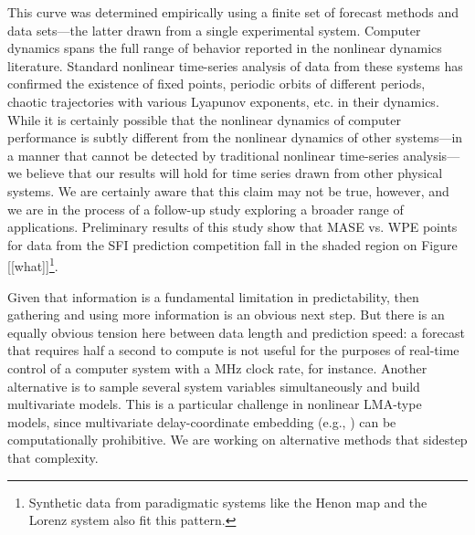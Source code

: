 This curve was determined empirically using a finite set of forecast
methods and data sets---the latter drawn from a single experimental
system.  Computer dynamics spans the full range of behavior reported
in the nonlinear dynamics literature.  Standard nonlinear time-series
analysis of data from these systems has confirmed the existence of
fixed points, periodic orbits of different periods, chaotic
trajectories with various Lyapunov exponents, etc. in their dynamics.
While it is certainly possible that the nonlinear dynamics of computer
performance is subtly different from the nonlinear dynamics of other
systems---in a manner that cannot be detected by traditional nonlinear
time-series analysis---we believe that our results will hold for time
series drawn from other physical systems.  We are certainly aware that
this claim may not be true, however, and we are in the process of a
follow-up study exploring a broader range of applications.
Preliminary results of this study show that MASE vs. WPE points for
data from the SFI prediction competition \cite{sfi} fall in the shaded
region on Figure [[what]]\footnote{Synthetic data from paradigmatic
  systems like the Henon map \cite{henon} and the Lorenz system
  \cite{lorenz63} also fit this pattern.}.

Given that information is a fundamental limitation in predictability,
then gathering and using more information is an obvious next step.
But there is an equally obvious tension here between data length and
prediction speed: a forecast that requires half a second to compute is
not useful for the purposes of real-time control of a computer system
with a MHz clock rate, for instance.  Another alternative is to sample
several system variables simultaneously and build multivariate models.
This is a particular challenge in nonlinear LMA-type models, since
multivariate delay-coordinate embedding (e.g.,
\cite{cao-multivariate-embedding,deyle-sugihara2011}) can be
computationally prohibitive.  We are working on alternative methods
that sidestep that complexity.


